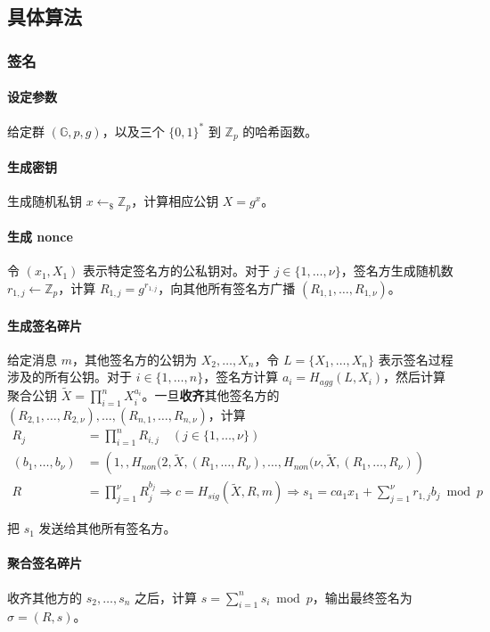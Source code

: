 \documentclass[a4paper,10pt]{article}
\newcommand{\bG}{\mathbb{G}}
\newcommand{\bZ}{\mathbb{Z}}
\begin{document}
\subsection{具体算法}
\subsubsection{签名}
\paragraph{设定参数} 给定群 \((\bG,p,g)\)，以及三个 \(\{0,1\}^*\) 到 \(\bZ_p\) 的哈希函数。
\paragraph{生成密钥} 生成随机私钥 \(x\leftarrow_{\$} \bZ_p\)，计算相应公钥 \(X=g^x\)。
\paragraph{生成 nonce} 令 \((x_1,X_1)\) 表示特定签名方的公私钥对。对于 \(j\in\{1,\dots,\nu\}\)，签名方生成随机数 \(r_{1,j}\leftarrow \bZ_p\)，计算 \(R_{1,j}=g^{r_{1,j}}\)，向其他所有签名方广播 \((R_{1,1},\dots,R_{1,\nu})\)。
\paragraph{生成签名碎片} 给定消息 \(m\)，其他签名方的公钥为 \(X_2,\dots,X_n\)，令 \(L=\{X_1,\dots,X_n\}\) 表示签名过程涉及的所有公钥。对于 \(i\in\{1,\dots,n\}\)，签名方计算 \(a_i=H_{agg}(L,X_i)\)，然后计算聚合公钥 \(\tilde{X}=\prod_{i=1}^n X_i^{a_i}\)。一旦\textbf{收齐}其他签名方的 \((R_{2,1},\dots,R_{2,\nu}),\dots,(R_{n,1},\dots,R_{n,\nu})\)，计算 
\begin{align*}
  R_j &= \prod_{i=1}^n R_{i,j}\quad (j\in\{1,\dots,\nu\}) \\
  (b_1,\dots,b_{\nu}) &=\left(1,,H_{non}(2,\tilde{X},(R_1,\dots,R_{\nu}),\dots,H_{non}(\nu,\tilde{X},(R_1,\dots,R_{\nu})\right) \\
  R &= \prod_{j=1}^{\nu} R_j^{b_j} \Rightarrow c = H_{sig}(\tilde{X},R,m) \Rightarrow s_1 = ca_1x_1+\sum_{j=1}^{\nu}r_{1,j}b_j\bmod p
\end{align*}

把 \(s_1\) 发送给其他所有签名方。

\paragraph{聚合签名碎片} 收齐其他方的 \(s_2,\dots,s_n\) 之后，计算 \(s=\sum_{i=1}^n s_i\bmod p\)，输出最终签名为 \(\sigma=(R,s)\)。
\end{document}
